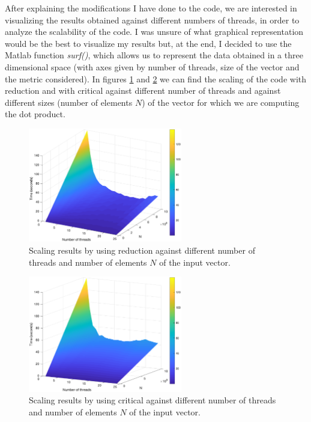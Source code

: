 \documentclass[unicode,11pt,a4paper,oneside,numbers=endperiod,openany]{scrartcl}
\begin{document}
\vskip 0.2in

After explaining the modifications I have done to the code, we are interested in visualizing the results obtained against different numbers of threads, in order to analyze the scalability of the code. I was unsure of what graphical representation would be the best to visualize my results but, at the end, I decided to use the Matlab function \emph{surf()}, which allows us to represent the data obtained in a three dimensional space (with axes given by number of threads, size of the vector and the metric considered). In figures \ref{fig:reductionScaling} and \ref{fig:criticalScaling} we can find the scaling of the code with reduction and with critical against different number of threads and against different sizes (number of elements $N$) of the vector for which we are computing the dot product.


\begin{figure}[h!]
\centering
\includegraphics[width=0.6\textwidth]{Figures/surfPlot_reduction.eps}
\caption{Scaling results by using reduction against different number of threads and number of elements $N$ of the input vector.}\label{fig:reductionScaling}
\end{figure}

\begin{figure}[h!]
\centering
\includegraphics[width=0.6\textwidth]{Figures/surfPlot_critical.eps}
\caption{Scaling results by using critical against different number of threads and number of elements $N$ of the input vector.}\label{fig:criticalScaling}
\end{figure}
\end{document}
